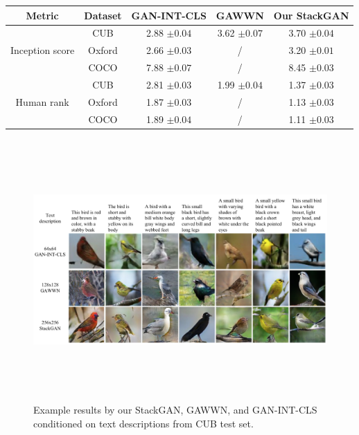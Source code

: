 \documentclass[a4paper,12pt,oneside]{article}
\begin{document}
\begin{center}
\begin{tabular}{ |c|c|c|c|c| }
\hline
 Metric & Dataset & GAN-INT-CLS & GAWWN & Our StackGAN \\
 \hline
 \multirow{3}{4em}{Inception score} & CUB & 2.88 $\pm 0.04$ & 3.62 $\pm 0.07$ & 3.70 $\pm 0.04$ \\\cline{2-5}
  & Oxford & 2.66 $\pm 0.03$ & / & 3.20 $\pm 0.01$ \\\cline{2-5}
  & COCO & 7.88 $\pm 0.07$ & / & 8.45 $\pm 0.03$ \\    
 \hline
 \multirow{3}{4em}{Human rank} & CUB & 2.81 $\pm 0.03$ & 1.99 $\pm 0.04$ & 1.37 $\pm 0.03$ \\\cline{2-5}
  & Oxford & 1.87 $\pm 0.03$ & / & 1.13 $\pm 0.03$ \\\cline{2-5}
  & COCO & 1.89 $\pm 0.04$ & / & 1.11 $\pm 0.03$ \\   
 \hline
\end{tabular}
\end{center}

\begin{figure}[H]
\centering
\includegraphics[height=10cm,width=15cm]{Figure3.png}
\caption{Example results by our StackGAN, GAWWN, and GAN-INT-CLS conditioned on text descriptions from CUB test set.}
\end{figure}
\end{document}
